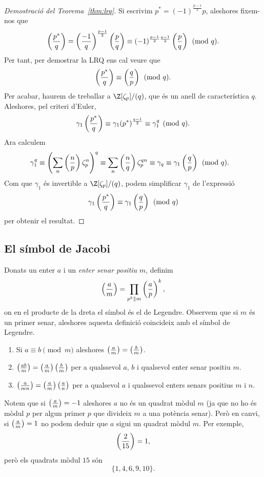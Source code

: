 \begin{proof}[Demostració del Teorema~\ref{thm:lrq}]
Si escrivim $p^*=(-1)^{\frac{p-1}{2}} p$, aleshores fixem-nos que
\[
\left(\frac{p^*}{q}\right) = \left(\frac{-1}{q}\right)^{\frac{p-1}{2}} \left(\frac{p}{q}\right) \equiv (-1)^{\frac{p-1}{2}\frac{q-1}{2}} \left(\frac{p}{q}\right) \pmod q.
\]
Per tant, per demostrar la LRQ ens cal veure que
\[
\left(\frac{p^*}{q}\right) \equiv \left(\frac{q}{p}\right) \pmod{q}.
\]
Per acabar, haurem de treballar a $\Z[\zeta_p]/(q)$, que és un anell de característica $q$. Aleshores, pel criteri d'Euler,
\[
\gamma_1\left(\frac{p^*}{q}\right)\equiv \gamma_1(p^*)^{\frac{q-1}{2}} \equiv \gamma_1^q\pmod{q}.
\]
Ara calculem
\begin{align*}
\gamma_1^q &\equiv \left(\sum_n \left(\frac{n}{p}\right)\zeta_p^n\right)^q \equiv \sum_n \left(\frac{n}{q}\right) \zeta_p^{qn} \equiv \gamma_q\equiv \gamma_1\left(\frac{q}{p}\right)\pmod{q}.
\end{align*}
Com que $\gamma_1$ és invertible a $\Z[\zeta_p]/(q)$, podem simplificar $\gamma_1$ de l'expressió
\[
\gamma_1\left(\frac{p^*}{q}\right)\equiv \gamma_1 \left(\frac{q}{p}\right)\pmod{q}
\]
per obtenir el resultat.

\end{proof}

\subsection{El símbol de Jacobi}
Donats un enter $a$ i un \emph{enter senar positiu} $m$, definim
\[
\left(\frac{a}{m}\right)=\prod_{p^k\parallel m} \left(\frac{a}{p}\right)^k,
\]
on en el producte de la dreta el símbol és el de Legendre. Observem que si $m$ és un primer senar, aleshores aquesta definició coincideix amb el símbol de Legendre.

\begin{lemma}
\begin{enumerate}
    \item Si $a\equiv b\pmod m$ aleshores $\left(\frac{a}{m}\right) = \left(\frac{b}{m}\right)$.
    \item $\left(\frac{ab}{m}\right)= \left(\frac{a}{m}\right) \left(\frac{b}{m}\right)$ per a qualssevol $a$, $b$ i qualsevol enter senar positiu $m$.
    \item $\left(\frac{a}{mn}\right) = \left(\frac{a}{m}\right) \left(\frac{a}{n}\right)$ per a qualsevol $a$ i qualssevol enters senars positius $m$ i $n$.
\end{enumerate}
\end{lemma}
\begin{remark}
 Notem que si $\left(\frac{a}{m}\right)=-1$ aleshores $a$ no és un quadrat mòdul $m$ (ja que no ho és mòdul $p$ per algun primer $p$ que divideix $m$ a una potència senar). Però en canvi, si $\left(\frac{a}{m}\right)=1$ no podem deduir que $a$ sigui un quadrat mòdul $m$. Per exemple,
 \[
 \left(\frac{2}{15}\right) = 1,
 \]
 però els quadrats mòdul $15$ són
 \[
 \{1,4,6,9,10\}.
 \]
\end{remark}


